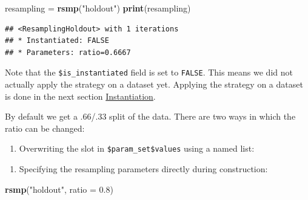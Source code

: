 \documentclass[]{scrbook}
\newenvironment{Shaded}{\begin{snugshade}}{\end{snugshade}}
\newcommand{\DataTypeTok}[1]{\textcolor[rgb]{0.13,0.29,0.53}{#1}}
\newcommand{\FloatTok}[1]{\textcolor[rgb]{0.00,0.00,0.81}{#1}}
\newcommand{\KeywordTok}[1]{\textcolor[rgb]{0.13,0.29,0.53}{\textbf{#1}}}
\newcommand{\NormalTok}[1]{#1}
\newcommand{\OperatorTok}[1]{\textcolor[rgb]{0.81,0.36,0.00}{\textbf{#1}}}
\newcommand{\StringTok}[1]{\textcolor[rgb]{0.31,0.60,0.02}{#1}}
\providecommand{\tightlist}{%
  \setlength{\itemsep}{0pt}\setlength{\parskip}{0pt}}
\renewenvironment{Shaded} {\begin{snugshade}\small} {\end{snugshade}}
\begin{document}
\begin{Shaded}
\begin{Highlighting}[]
\NormalTok{resampling =}\StringTok{ }\KeywordTok{rsmp}\NormalTok{(}\StringTok{"holdout"}\NormalTok{)}
\KeywordTok{print}\NormalTok{(resampling)}
\end{Highlighting}
\end{Shaded}

\begin{verbatim}
## <ResamplingHoldout> with 1 iterations
## * Instantiated: FALSE
## * Parameters: ratio=0.6667
\end{verbatim}

Note that the \texttt{\$is\_instantiated} field is set to \texttt{FALSE}.
This means we did not actually apply the strategy on a dataset yet.
Applying the strategy on a dataset is done in the next section \protect\hyperlink{instantiation}{Instantiation}.

By default we get a .66/.33 split of the data.
There are two ways in which the ratio can be changed:

\begin{enumerate}
\def\labelenumi{\arabic{enumi}.}
\tightlist
\item
  Overwriting the slot in \texttt{\$param\_set\$values} using a named list:
\end{enumerate}

\begin{Shaded}
\end{Shaded}

\begin{enumerate}
\def\labelenumi{\arabic{enumi}.}
\setcounter{enumi}{1}
\tightlist
\item
  Specifying the resampling parameters directly during construction:
\end{enumerate}

\begin{Shaded}
\begin{Highlighting}[]
\KeywordTok{rsmp}\NormalTok{(}\StringTok{"holdout"}\NormalTok{, }\DataTypeTok{ratio =} \FloatTok{0.8}\NormalTok{)}
\end{Highlighting}
\end{Shaded}
\end{document}
